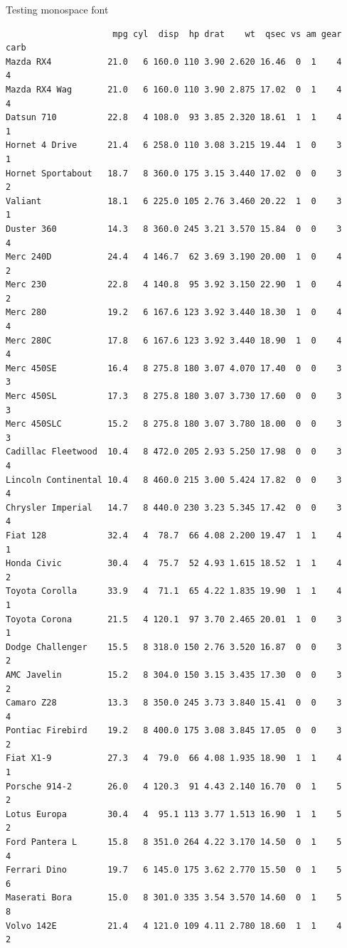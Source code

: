 \documentclass[
  14pt,
  ignorenonframetext,
  aspectratio=169,
]{beamer}
\begin{document}
\begin{frame}[fragile]{Testing monospace font}
\begin{verbatim}
                     mpg cyl  disp  hp drat    wt  qsec vs am gear carb
Mazda RX4           21.0   6 160.0 110 3.90 2.620 16.46  0  1    4    4
Mazda RX4 Wag       21.0   6 160.0 110 3.90 2.875 17.02  0  1    4    4
Datsun 710          22.8   4 108.0  93 3.85 2.320 18.61  1  1    4    1
Hornet 4 Drive      21.4   6 258.0 110 3.08 3.215 19.44  1  0    3    1
Hornet Sportabout   18.7   8 360.0 175 3.15 3.440 17.02  0  0    3    2
Valiant             18.1   6 225.0 105 2.76 3.460 20.22  1  0    3    1
Duster 360          14.3   8 360.0 245 3.21 3.570 15.84  0  0    3    4
Merc 240D           24.4   4 146.7  62 3.69 3.190 20.00  1  0    4    2
Merc 230            22.8   4 140.8  95 3.92 3.150 22.90  1  0    4    2
Merc 280            19.2   6 167.6 123 3.92 3.440 18.30  1  0    4    4
Merc 280C           17.8   6 167.6 123 3.92 3.440 18.90  1  0    4    4
Merc 450SE          16.4   8 275.8 180 3.07 4.070 17.40  0  0    3    3
Merc 450SL          17.3   8 275.8 180 3.07 3.730 17.60  0  0    3    3
Merc 450SLC         15.2   8 275.8 180 3.07 3.780 18.00  0  0    3    3
Cadillac Fleetwood  10.4   8 472.0 205 2.93 5.250 17.98  0  0    3    4
Lincoln Continental 10.4   8 460.0 215 3.00 5.424 17.82  0  0    3    4
Chrysler Imperial   14.7   8 440.0 230 3.23 5.345 17.42  0  0    3    4
Fiat 128            32.4   4  78.7  66 4.08 2.200 19.47  1  1    4    1
Honda Civic         30.4   4  75.7  52 4.93 1.615 18.52  1  1    4    2
Toyota Corolla      33.9   4  71.1  65 4.22 1.835 19.90  1  1    4    1
Toyota Corona       21.5   4 120.1  97 3.70 2.465 20.01  1  0    3    1
Dodge Challenger    15.5   8 318.0 150 2.76 3.520 16.87  0  0    3    2
AMC Javelin         15.2   8 304.0 150 3.15 3.435 17.30  0  0    3    2
Camaro Z28          13.3   8 350.0 245 3.73 3.840 15.41  0  0    3    4
Pontiac Firebird    19.2   8 400.0 175 3.08 3.845 17.05  0  0    3    2
Fiat X1-9           27.3   4  79.0  66 4.08 1.935 18.90  1  1    4    1
Porsche 914-2       26.0   4 120.3  91 4.43 2.140 16.70  0  1    5    2
Lotus Europa        30.4   4  95.1 113 3.77 1.513 16.90  1  1    5    2
Ford Pantera L      15.8   8 351.0 264 4.22 3.170 14.50  0  1    5    4
Ferrari Dino        19.7   6 145.0 175 3.62 2.770 15.50  0  1    5    6
Maserati Bora       15.0   8 301.0 335 3.54 3.570 14.60  0  1    5    8
Volvo 142E          21.4   4 121.0 109 4.11 2.780 18.60  1  1    4    2
\end{verbatim}
\end{frame}
\end{document}
